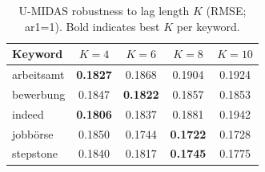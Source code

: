 \documentclass[12pt,a4paper]{article}
\begin{document}
\begin{table}[ht]
\centering
\caption{U-MIDAS robustness to lag length $K$ (RMSE; ar1=1). Bold indicates best $K$ per keyword.}
\label{tab:midas_K_robust}
\begin{tabular}{lcccc}
\toprule
\textbf{Keyword} & \textbf{$K=4$} & \textbf{$K=6$} & \textbf{$K=8$} & \textbf{$K=10$} \\
\midrule
arbeitsamt & \textbf{0.1827} & 0.1868 & 0.1904 & 0.1924 \\
bewerbung  & 0.1847 & \textbf{0.1822} & 0.1857 & 0.1853 \\
indeed     & \textbf{0.1806} & 0.1837 & 0.1881 & 0.1942 \\
jobbörse   & 0.1850 & 0.1744 & \textbf{0.1722} & 0.1728 \\
stepstone  & 0.1840 & 0.1817 & \textbf{0.1745} & 0.1775 \\
\bottomrule
\end{tabular}
\end{table}




\newpage

\end{document}
